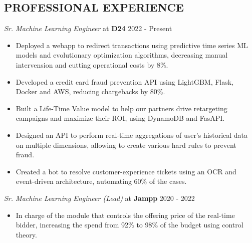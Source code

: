 \documentclass[margin]{res}
\begin{document}
\begin{resume}
    \section{PROFESSIONAL EXPERIENCE} 
    {\sl Sr. Machine Learning Engineer} at {\bf D24} \hfill 2022 - Present
    \begin{itemize}  \itemsep -2pt %
        \item Deployed a webapp to redirect transactions using predictive time series ML models and evolutionary optimization algorithms,
            decreasing manual intervension and cutting operational costs by 8\%.
        \item Developed a credit card fraud prevention API using LightGBM, Flask, Docker and AWS, 
            reducing chargebacks by 80\%.
        \item Built a Life-Time Value model to help our partners drive retargeting campaigns and maximize their ROI,
            using DynamoDB and FasAPI.
        \item Designed an API to perform real-time aggregations of user's historical data on multiple dimensions,
            allowing to create various hard rules to prevent fraud.
        \item Created a bot to resolve customer-experience tickets using an OCR and event-driven architecture, 
            automating 60\% of the cases.
    \end{itemize}
    {\sl Sr. Machine Learning Engineer (Lead)} at {\bf Jampp} \hfill 2020 - 2022
    \begin{itemize}  \itemsep -2pt %
        \item In charge of the module that controls the offering price of the
            real-time bidder, increasing the spend from 92\% to 98\%
            of the budget using control theory.

\end{itemize}
\end{resume}
\end{document}

